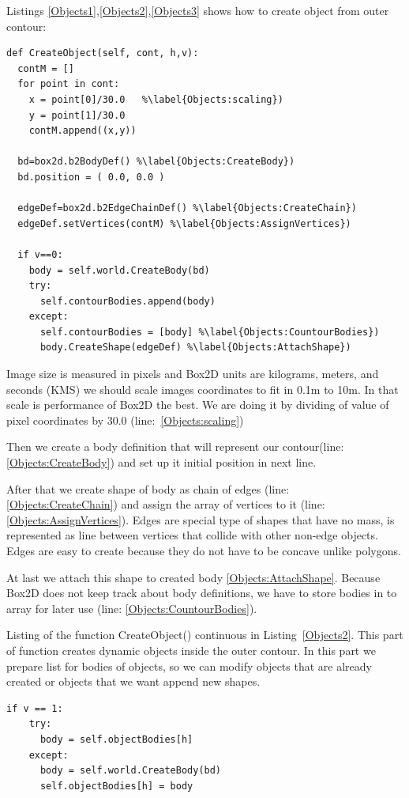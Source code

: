 \documentclass{ifacconf}
\begin{document}
Listings \ref{Objects1},\ref{Objects2},\ref{Objects3} shows how to create object
from outer contour:
\begin{lstlisting}[name=Objects,label=Objects1,caption=Creation of object from
outer contour]
def CreateObject(self, cont, h,v):
  contM = []
  for point in cont:
    x = point[0]/30.0	%\label{Objects:scaling})
    y = point[1]/30.0
    contM.append((x,y))
    
  bd=box2d.b2BodyDef() %\label{Objects:CreateBody})
  bd.position = ( 0.0, 0.0 )
  
  edgeDef=box2d.b2EdgeChainDef() %\label{Objects:CreateChain})
  edgeDef.setVertices(contM) %\label{Objects:AssignVertices})

  if v==0:
    body = self.world.CreateBody(bd)
    try:
      self.contourBodies.append(body)
    except:
      self.contourBodies = [body] %\label{Objects:CountourBodies})
      body.CreateShape(edgeDef) %\label{Objects:AttachShape})
\end{lstlisting}
Image size is measured in pixels and Box2D units are kilograms, meters,
and seconds (KMS) we should scale images coordinates to fit in 0.1m to
10m. In that scale is performance of Box2D the best. We are doing it by
dividing of value of pixel coordinates by 30.0 (line:~\ref{Objects:scaling})

Then we create a body definition that will represent our contour(line:~
\ref{Objects:CreateBody}) and set up it initial position in next line.

After that we create shape of body as chain of edges (line:~
\ref{Objects:CreateChain}) and assign the array of vertices to it (line:~
\ref{Objects:AssignVertices}). Edges are special type of shapes that have no
mass, is represented as line between vertices that collide with other non-edge
objects. Edges are easy to create because they do not have to be concave unlike
polygons.

At last we attach this shape to created body \ref{Objects:AttachShape}. Because
Box2D does not keep track about body definitions, we have to store bodies in to
array for later use (line: \ref{Objects:CountourBodies}).

Listing of the function CreateObject() continuous in Listing~\ref{Objects2}. This
part of function creates dynamic objects inside the outer contour. In this part
we prepare list for bodies of objects, so we can modify objects that are already
created or objects that we want append new shapes.
\begin{lstlisting}[name=Objects,firstnumber=auto,label=Objects2,caption=Creation of objects] if v == 1:
    try:
      body = self.objectBodies[h]
    except:
      body = self.world.CreateBody(bd)
      self.objectBodies[h] = body
\end{lstlisting}
\end{document}
